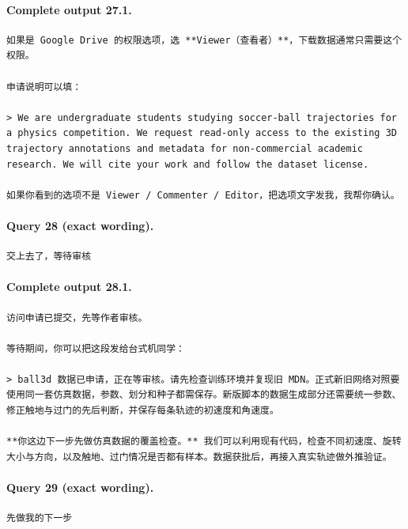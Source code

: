 \documentclass[UTF8,10pt]{ctexart}
\begin{document}
\paragraph{Complete output 27.1.}
\begin{Verbatim}[breaklines=true,breakanywhere=true,fontsize=\scriptsize,frame=single,framesep=2pt]
如果是 Google Drive 的权限选项，选 **Viewer（查看者）**，下载数据通常只需要这个权限。

申请说明可以填：

> We are undergraduate students studying soccer-ball trajectories for a physics competition. We request read-only access to the existing 3D trajectory annotations and metadata for non-commercial academic research. We will cite your work and follow the dataset license.

如果你看到的选项不是 Viewer / Commenter / Editor，把选项文字发我，我帮你确认。
\end{Verbatim}

\paragraph{Query 28 (exact wording).}
\begin{Verbatim}[breaklines=true,breakanywhere=true,fontsize=\scriptsize,frame=single,framesep=2pt]
交上去了，等待审核
\end{Verbatim}

\paragraph{Complete output 28.1.}
\begin{Verbatim}[breaklines=true,breakanywhere=true,fontsize=\scriptsize,frame=single,framesep=2pt]
访问申请已提交，先等作者审核。

等待期间，你可以把这段发给台式机同学：

> ball3d 数据已申请，正在等审核。请先检查训练环境并复现旧 MDN。正式新旧网络对照要使用同一套仿真数据，参数、划分和种子都需保存。新版脚本的数据生成部分还需要统一参数、修正触地与过门的先后判断，并保存每条轨迹的初速度和角速度。

**你这边下一步先做仿真数据的覆盖检查。** 我们可以利用现有代码，检查不同初速度、旋转大小与方向，以及触地、过门情况是否都有样本。数据获批后，再接入真实轨迹做外推验证。
\end{Verbatim}

\paragraph{Query 29 (exact wording).}
\begin{Verbatim}[breaklines=true,breakanywhere=true,fontsize=\scriptsize,frame=single,framesep=2pt]
先做我的下一步
\end{Verbatim}
\end{document}
